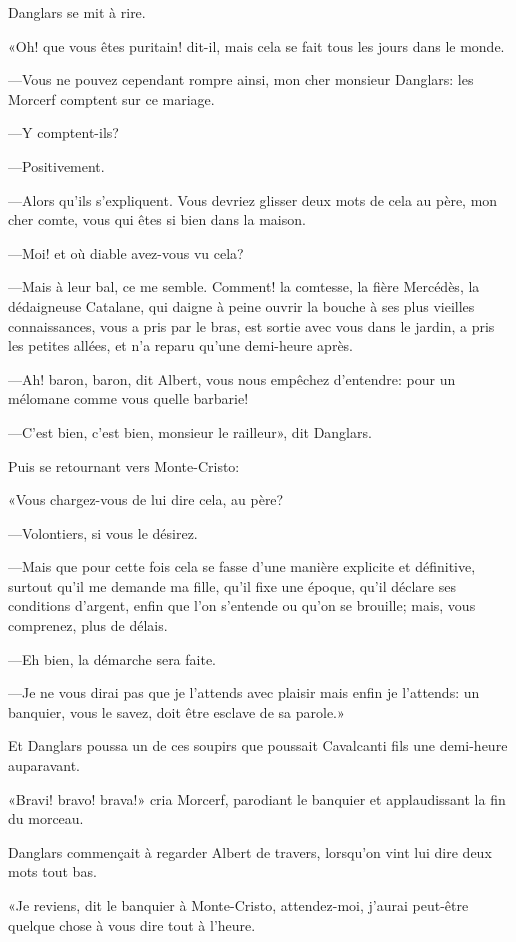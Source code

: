 Danglars se mit à rire. 

«Oh! que vous êtes puritain! dit-il, mais cela se fait tous les jours dans le monde. 

—Vous ne pouvez cependant rompre ainsi, mon cher monsieur Danglars: les Morcerf comptent sur ce mariage. 

—Y comptent-ils? 

—Positivement. 

—Alors qu'ils s'expliquent. Vous devriez glisser deux mots de cela au père, mon cher comte, vous qui êtes si bien dans la maison. 

—Moi! et où diable avez-vous vu cela? 

—Mais à leur bal, ce me semble. Comment! la comtesse, la fière Mercédès, la dédaigneuse Catalane, qui daigne à peine ouvrir la bouche à ses plus vieilles connaissances, vous a pris par le bras, est sortie avec vous dans le jardin, a pris les petites allées, et n'a reparu qu'une demi-heure après. 

—Ah! baron, baron, dit Albert, vous nous empêchez d'entendre: pour un mélomane comme vous quelle barbarie! 

—C'est bien, c'est bien, monsieur le railleur», dit Danglars. 

Puis se retournant vers Monte-Cristo: 

«Vous chargez-vous de lui dire cela, au père? 

—Volontiers, si vous le désirez. 

—Mais que pour cette fois cela se fasse d'une manière explicite et définitive, surtout qu'il me demande ma fille, qu'il fixe une époque, qu'il déclare ses conditions d'argent, enfin que l'on s'entende ou qu'on se brouille; mais, vous comprenez, plus de délais. 

—Eh bien, la démarche sera faite. 

—Je ne vous dirai pas que je l'attends avec plaisir mais enfin je l'attends: un banquier, vous le savez, doit être esclave de sa parole.» 

Et Danglars poussa un de ces soupirs que poussait Cavalcanti fils une demi-heure auparavant. 

«Bravi! bravo! brava!» cria Morcerf, parodiant le banquier et applaudissant la fin du morceau. 

Danglars commençait à regarder Albert de travers, lorsqu'on vint lui dire deux mots tout bas. 

«Je reviens, dit le banquier à Monte-Cristo, attendez-moi, j'aurai peut-être quelque chose à vous dire tout à l'heure. 

